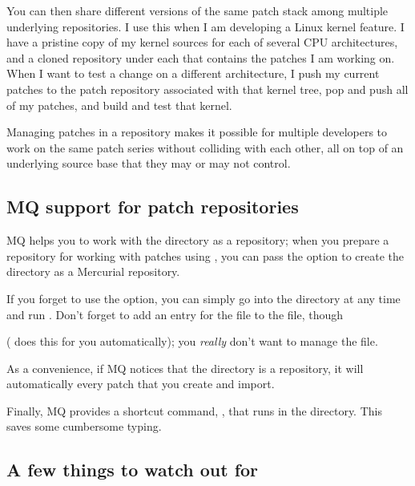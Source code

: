 You can then share different versions of the same patch stack among
multiple underlying repositories.  I use this when I am developing a
Linux kernel feature.  I have a pristine copy of my kernel sources for
each of several CPU architectures, and a cloned repository under each
that contains the patches I am working on.  When I want to test a
change on a different architecture, I push my current patches to the
patch repository associated with that kernel tree, pop and push all of
my patches, and build and test that kernel.

Managing patches in a repository makes it possible for multiple
developers to work on the same patch series without colliding with
each other, all on top of an underlying source base that they may or
may not control.

\subsection{MQ support for patch repositories}

MQ helps you to work with the  directory as a
repository; when you prepare a repository for working with patches
using , you can pass the  option to
create the  directory as a Mercurial repository.

\begin{note}
  If you forget to use the  option, you can simply go
  into the  directory at any time and run
  .  Don't forget to add an entry for the
   file to the  file, though

  ( does this for you
  automatically); you \emph{really} don't want to manage the
   file.
\end{note}

As a convenience, if MQ notices that the 
directory is a repository, it will automatically  every
patch that you create and import.

Finally, MQ provides a shortcut command, , that runs
 in the  directory.  This saves
some cumbersome typing.

\subsection{A few things to watch out for}

